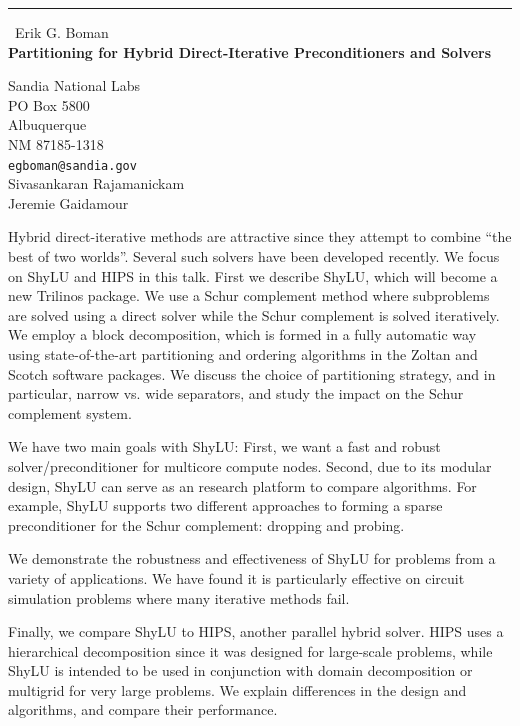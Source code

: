\documentclass{report}
\begin{document}
\begin{center}
\rule{6in}{1pt} \
{\large Erik G. Boman \\
{\bf Partitioning for Hybrid Direct-Iterative Preconditioners and Solvers}}

Sandia National Labs \\ PO Box 5800 \\ Albuquerque \\ NM 87185-1318
\\
{\tt egboman@sandia.gov}\\
Sivasankaran Rajamanickam\\
Jeremie Gaidamour\end{center}

Hybrid direct-iterative methods are attractive since they attempt
to combine ``the best of two worlds''. Several such solvers have been
developed recently. We focus on ShyLU and HIPS in this talk.
First we describe ShyLU, which will become a new Trilinos package.
We use a Schur complement method where subproblems are solved using a
direct solver while the Schur complement is solved iteratively.
We employ a block decomposition, which is formed in a fully automatic way
using state-of-the-art partitioning and ordering algorithms in
the Zoltan and Scotch software packages. We discuss the choice of
partitioning strategy, and in particular, narrow vs. wide separators,
and study the impact on the Schur complement system.

We have two main goals with ShyLU: First, we want a fast and robust
solver/preconditioner for multicore compute nodes. Second, due to its
modular design, ShyLU can serve as an research platform to compare
algorithms. For example, ShyLU supports two different approaches
to forming a sparse preconditioner for the Schur complement:
dropping and probing.

We demonstrate the robustness and effectiveness of ShyLU
for problems from a variety of applications. We have found
it is particularly effective on circuit simulation problems where
many iterative methods fail.

Finally, we compare ShyLU to HIPS, another parallel hybrid solver.
HIPS uses a hierarchical decomposition since it was designed for
large-scale problems, while ShyLU is intended to be used in conjunction
with domain decomposition or multigrid for very large problems.
We explain differences in the design and algorithms, and compare
their performance.
\end{document}
